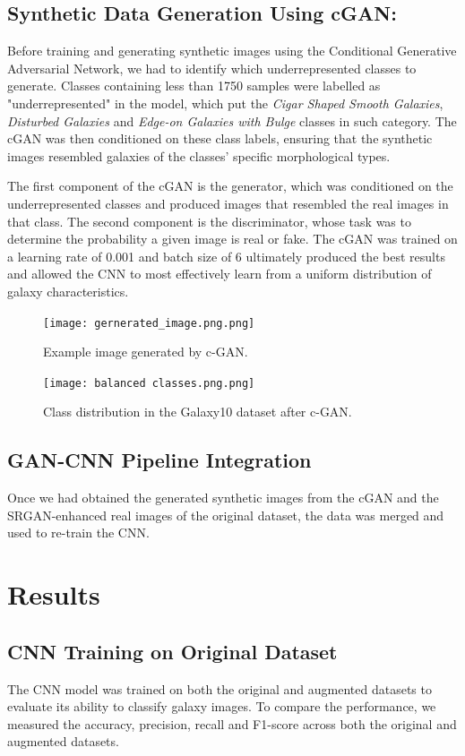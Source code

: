 \documentclass[10pt,twocolumn,letterpaper]{article}
\begin{document}
\subsection{Synthetic Data Generation Using cGAN:} 
Before training and generating synthetic images using the Conditional Generative Adversarial Network, we had to identify which underrepresented classes to generate.
Classes containing less than 1750 samples were labelled as "underrepresented" in the model, which put the \textit{Cigar Shaped Smooth Galaxies}, \textit{Disturbed Galaxies} and \textit{Edge-on Galaxies with Bulge} classes in such category.
The cGAN was then conditioned on these class labels, ensuring that the synthetic images resembled galaxies of the classes' specific morphological types. 

The first component of the cGAN is the generator, which was conditioned on the underrepresented classes and produced images that resembled the real images in that class.
The second component is the discriminator, whose task was to determine the probability a given image is real or fake.
The cGAN was trained on a learning rate of 0.001 and batch size of 6 ultimately produced the best results and allowed the CNN to most effectively learn from a uniform distribution of galaxy characteristics.

\begin{figure}[htbp]
  \texttt{[image: gernerated\_image.png.png]}
  \caption{Example image generated by c-GAN.}
  \label{fig:featuredist2}
\end{figure}
\begin{figure}[htbp]
  \texttt{[image: balanced classes.png.png]}
  \caption{Class distribution in the Galaxy10 dataset after c-GAN.}
  \label{fig:featuredist2}
\end{figure}

\subsection{GAN-CNN Pipeline Integration} 
Once we had obtained the generated synthetic images from the cGAN and the SRGAN-enhanced real images of the original dataset, the data was merged and used to re-train the CNN.



\section{Results}
\subsection{CNN Training on Original Dataset}
The CNN model was trained on both the original and augmented datasets to evaluate its ability to classify galaxy images. 
To compare the performance, we measured the accuracy, precision, recall and F1-score across both the original and augmented datasets.
\end{document}
